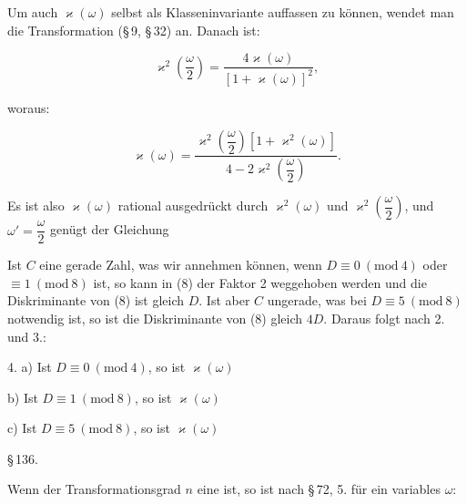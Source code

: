 
Um auch $\varkappa(\omega)$ selbst als Klasseninvariante auffassen zu
können, wendet man die  Transformation (\S\,9, \S\,32)
an. Danach ist:

\[ \varkappa^2\left(\dfrac{\omega}{2}\right) = \dfrac{4\varkappa(\omega)}{[1+\varkappa(\omega)]^2}, \]

woraus:

\[ \varkappa(\omega) = \dfrac{\varkappa^2\left(\dfrac{\omega}{2}\right)[1+\varkappa^2(\omega)]}{4-2\varkappa^2\left(\dfrac{\omega}{2}\right)}. \]

Es ist also $\varkappa(\omega)$ rational ausgedrückt durch $\varkappa^2(\omega)$ und
$\varkappa^2\left(\dfrac{\omega}{2}\right)$, und $\omega' = \dfrac{\omega}{2}$ genügt der Gleichung


Ist $C$ eine gerade Zahl, was wir annehmen können, wenn
$D\equiv 0\ (\mathrm{mod}\ 4)$ oder $\equiv 1\ (\mathrm{mod}\ 8)$ ist, so kann in (8) der
Faktor 2 weggehoben werden und die Diskriminante von (8) ist
gleich $D$. Ist aber $C$ ungerade, was bei $D\equiv 5\ (\mathrm{mod}\ 8)$ notwendig ist, so ist die Diskriminante von (8) gleich $4D$. Daraus
folgt nach 2. und 3.:

4. a) Ist $D\equiv 0\ (\mathrm{mod}\ 4)$, so ist $\varkappa(\omega)$ 

b) Ist $D\equiv 1\ (\mathrm{mod}\ 8)$, so ist $\varkappa(\omega)$ 

c) Ist $D\equiv 5\ (\mathrm{mod}\ 8)$, so ist $\varkappa(\omega)$ 

\begin{center}
\S\,136.\quad {}
\end{center}

Wenn der Transformationsgrad $n$ eine 
ist, so ist nach \S\,72, 5. für ein variables $\omega$:

